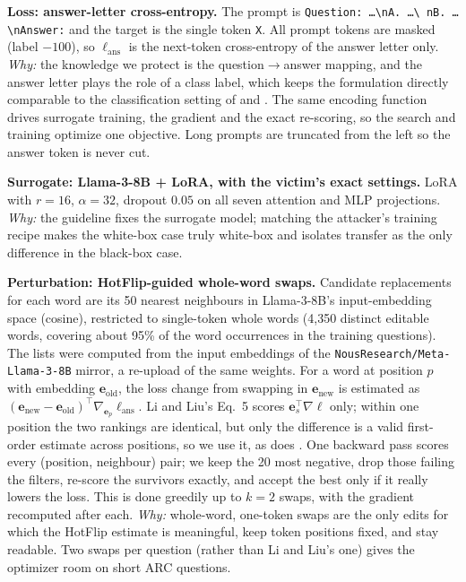 \documentclass{article}
\begin{document}
\textbf{Loss: answer-letter cross-entropy.} The prompt is \texttt{Question: \dots\textbackslash nA. \dots\textbackslash
nB. \dots\textbackslash nAnswer:} and the target is the single token \texttt{\textvisiblespace X}. All prompt tokens are
masked (label $-100$), so $\ell_{\text{ans}}$ is the next-token cross-entropy of the answer letter only.
\emph{Why:} the knowledge we protect is the question$\rightarrow$answer mapping, and the answer letter plays the role of
a class label, which keeps the formulation directly comparable to the classification setting of
\citet{huang2021unlearnable} and \citet{li2023maketext}. The same encoding function drives surrogate training, the
gradient and the exact re-scoring, so the search and training optimize one objective. Long prompts are truncated from
the left so the answer token is never cut.

\textbf{Surrogate: Llama-3-8B + LoRA, with the victim's exact settings.} LoRA \citep{hu2022lora} with $r=16$,
$\alpha=32$, dropout $0.05$ on all seven attention and MLP projections. \emph{Why:} the guideline fixes the surrogate
model; matching the attacker's training recipe makes the white-box case truly white-box and isolates transfer as the
only difference in the black-box case.

\textbf{Perturbation: HotFlip-guided whole-word swaps.} Candidate replacements for each word are its 50 nearest
neighbours in Llama-3-8B's input-embedding space (cosine), restricted to single-token whole words (4{,}350 distinct editable words,
covering about 95\% of the word occurrences in the training questions). The lists were computed from the input
embeddings of the \texttt{NousResearch/Meta-Llama-3-8B} mirror, a re-upload of the same weights. For a word at position
$p$ with embedding $\mathbf e_{\text{old}}$, the loss change from swapping in $\mathbf e_{\text{new}}$ is estimated as
$(\mathbf e_{\text{new}}-\mathbf e_{\text{old}})^\top\nabla_{\mathbf e_p}\ell_{\text{ans}}$. Li and Liu's Eq.~5 scores
$\mathbf e_s^\top\nabla\ell$ only; within one position the two rankings are identical, but only the difference is a
valid first-order estimate across positions, so we use it, as does \citet[Eq.~4]{zhao2026textcloak}. One backward pass
scores every (position, neighbour) pair; we keep the 20 most negative, drop those failing the filters, re-score the
survivors exactly, and accept the best only if it really lowers the loss. This is done greedily up to $k=2$ swaps, with
the gradient recomputed after each. \emph{Why:} whole-word, one-token swaps are the only edits for which the HotFlip
estimate is meaningful, keep token positions fixed, and stay readable. Two swaps per question (rather than Li and Liu's
one) gives the optimizer room on short ARC questions.
\end{document}
